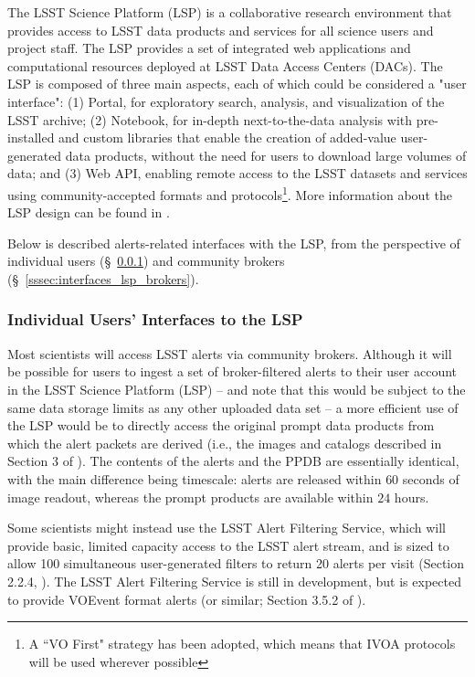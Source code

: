 The LSST Science Platform (LSP) is a collaborative research environment that provides access to LSST data products and services for all science users and project staff.
The LSP provides a set of integrated web applications and computational resources deployed at LSST Data Access Centers (DACs).
The LSP is composed of three main aspects, each of which could be considered a "user interface":
(1) Portal, for exploratory search, analysis, and visualization of the LSST archive;
(2) Notebook, for in-depth next-to-the-data analysis with pre-installed and custom libraries that enable the creation of added-value user-generated data products, without the need for users to download large volumes of data; and
(3) Web API, enabling remote access to the LSST datasets and services using community-accepted formats and protocols\footnote{A ``VO First" strategy has been adopted, which means that IVOA protocols will be used wherever possible}.
More information about the LSP design can be found in \citet{LSE-319,LDM-542}.

Below is described alerts-related interfaces with the LSP, from the perspective of individual users (\S~\ref{sssec:interfaces_lsp_individual}) and community brokers (\S~\ref{sssec:interfaces_lsp_brokers}).

\subsubsection{Individual Users' Interfaces to the LSP}\label{sssec:interfaces_lsp_individual}

Most scientists will access LSST alerts via community brokers.
Although it will be possible for users to ingest a set of broker-filtered alerts to their user account in the LSST Science Platform (LSP) -- and note that this would be subject to the same data storage limits as any other uploaded data set -- a more efficient use of the LSP would be to directly access the original prompt data products from which the alert packets are derived (i.e., the images and catalogs described in Section 3 of \citealt{LSE-163}).
The contents of the alerts and the PPDB are essentially identical, with the main difference being timescale: alerts are released within $60$ seconds of image readout, whereas the prompt products are available within $24$ hours.

Some scientists might instead use the LSST Alert Filtering Service, which will provide basic, limited capacity access to the LSST alert stream, and is sized to allow 100 simultaneous user-generated filters to return 20 alerts per visit (Section 2.2.4, \citealt{LSE-61}).
The LSST Alert Filtering Service is still in development, but is expected to provide VOEvent format alerts (or similar; Section 3.5.2 of \citealt{LSE-163}).

